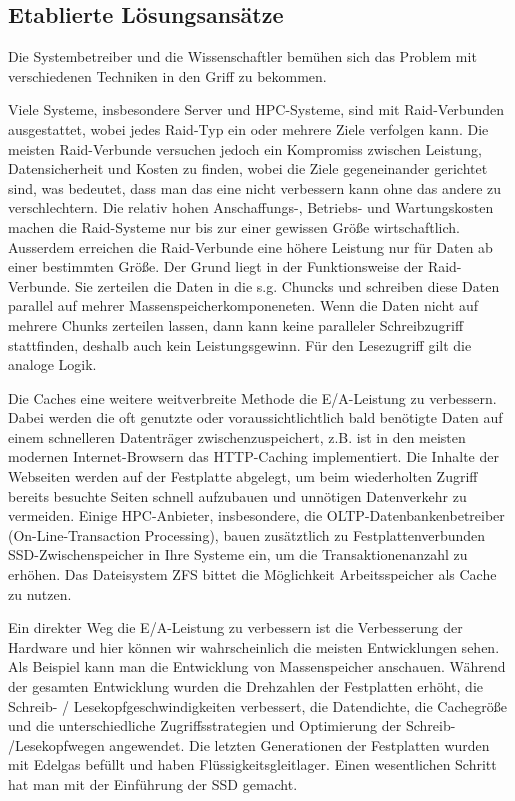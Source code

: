 \subsection{Etablierte Lösungsansätze}
Die Systembetreiber und die Wissenschaftler bemühen sich das Problem mit verschiedenen Techniken in den Griff zu bekommen. 

Viele Systeme, insbesondere Server und HPC-Systeme, sind mit Raid-Verbunden ausgestattet, wobei jedes Raid-Typ ein oder mehrere Ziele verfolgen kann. Die meisten Raid-Verbunde versuchen jedoch ein Kompromiss zwischen Leistung, Datensicherheit und Kosten zu finden, wobei die Ziele gegeneinander gerichtet sind, was bedeutet, dass man das eine nicht verbessern kann ohne das andere zu verschlechtern. Die relativ hohen Anschaffungs-, Betriebs- und Wartungskosten machen die Raid-Systeme nur bis zur einer gewissen Größe wirtschaftlich. Ausserdem erreichen die Raid-Verbunde eine höhere Leistung nur für Daten ab einer bestimmten Größe. Der Grund liegt in der Funktionsweise der Raid-Verbunde. Sie zerteilen die Daten in die s.g. Chuncks und schreiben diese Daten parallel auf mehrer Massenspeicherkomponeneten. Wenn die Daten nicht auf mehrere Chunks zerteilen lassen, dann kann keine paralleler Schreibzugriff stattfinden, deshalb auch kein Leistungsgewinn. Für den Lesezugriff gilt die analoge Logik.

Die Caches eine weitere weitverbreite Methode die E/A-Leistung zu verbessern. Dabei werden die oft genutzte oder voraussichtlichtlich bald benötigte Daten auf einem schnelleren Datenträger zwischenzuspeichert, z.B. ist in den meisten modernen Internet-Browsern das HTTP-Caching implementiert. Die Inhalte der Webseiten werden auf der Festplatte abgelegt, um beim wiederholten Zugriff bereits besuchte Seiten schnell aufzubauen und unnötigen Datenverkehr zu vermeiden. Einige HPC-Anbieter, insbesondere, die OLTP-Datenbankenbetreiber (On-Line-Transaction Processing), bauen zusätztlich zu Festplattenverbunden SSD-Zwischenspeicher in Ihre Systeme ein, um die Transaktionenanzahl zu erhöhen. 
Das Dateisystem ZFS bittet die Möglichkeit Arbeitsspeicher als Cache zu nutzen.

Ein direkter Weg die E/A-Leistung zu verbessern ist die Verbesserung der Hardware und hier können wir wahrscheinlich die meisten Entwicklungen sehen. Als Beispiel kann man die Entwicklung von Massenspeicher anschauen. Während der gesamten Entwicklung wurden die Drehzahlen der Festplatten erhöht, die Schreib- / Lesekopfgeschwindigkeiten verbessert, die Datendichte, die Cachegröße und die unterschiedliche Zugriffsstrategien und Optimierung der Schreib- /Lesekopfwegen angewendet. Die letzten Generationen der Festplatten wurden mit Edelgas befüllt und haben Flüssigkeitsgleitlager. Einen wesentlichen Schritt hat man mit der Einführung der SSD gemacht. 


